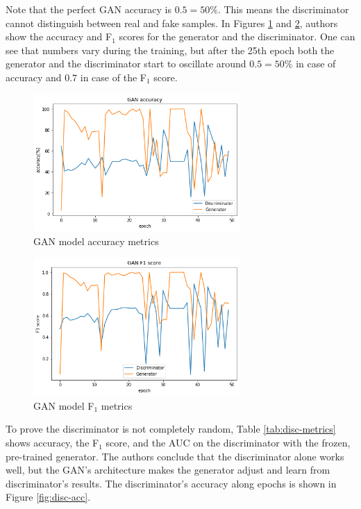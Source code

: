 \documentclass[a4paper, 11pt, twoside]{report}
\theoremstyle{definition}
\begin{document}
Note that the perfect GAN accuracy is $0.5 = 50\%$. This means the discriminator cannot distinguish between real and fake samples. In Figures \ref{fig:GAN-acc} and \ref{fig:GAN-f1}, authors show the accuracy and F$_1$ scores for the generator and the discriminator. One can see that numbers vary during the training, but after the 25th epoch both the generator and the discriminator start to oscillate around $0.5 = 50\%$ in case of accuracy and $0.7$ in case of the F$_1$ score. \par

\begin{figure}[H]
    \centering
    \includegraphics[width=0.7\textwidth]{assets/accuracy_gan.png}
    \caption{GAN model accuracy metrics}
    \label{fig:GAN-acc}
\end{figure}

\begin{figure}[H]
    \centering
    \includegraphics[width=0.7\textwidth]{assets/f1_gan.png}
    \caption{GAN model F$_1$ metrics}
    \label{fig:GAN-f1}
\end{figure}

To prove the discriminator is not completely random, Table \ref{tab:disc-metrics} shows accuracy, the F$_1$ score, and the AUC on the discriminator with the frozen, pre-trained generator. The authors conclude that the discriminator alone works well, but the GAN's architecture makes the generator adjust and learn from discriminator's results. The discriminator's accuracy along epochs is shown in Figure \ref{fig:disc-acc}. \par
\end{document}
